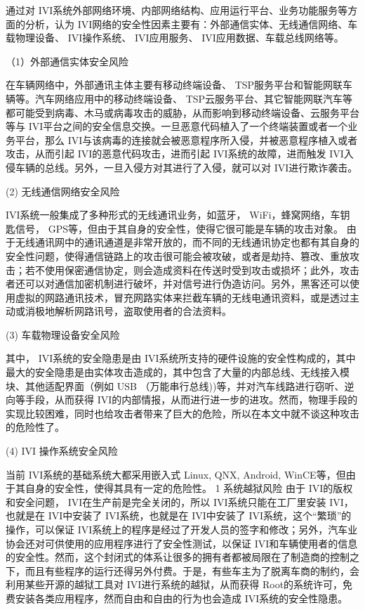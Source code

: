 通过对 IVI系统外部网络环境、内部网络结构、应用运行平台、业务功能服务等方面的分析，认为 IVI网络的安全性因素主要有：外部通信实体、无线通信网络、车载物理设备、 IVI操作系统、 IVI应用服务、 IVI应用数据、车载总线网络等。

（1）外部通信实体安全风险

在车辆网络中，外部通讯主体主要有移动终端设备、 TSP服务平台和智能网联车辆等。汽车网络应用中的移动终端设备、 TSP云服务平台、其它智能网联汽车等都可能受到病毒、木马或病毒攻击的威胁，从而影响到移动终端设备、云服务平台等与 IVI平台之间的安全信息交换。一旦恶意代码植入了一个终端装置或者一个业务平台，那么 IVI与该病毒的连接就会被恶意程序所入侵，并被恶意程序植入或者攻击，从而引起 IVI的恶意代码攻击，进而引起 IVI系统的故障，进而触发 IVI入侵车辆的总线。另外，一旦入侵方对其进行了入侵，就可以对 IVI进行欺诈袭击。

(2) 无线通信网络安全风险 

IVI系统一般集成了多种形式的无线通讯业务，如蓝牙， WiFi，蜂窝网络，车钥匙信号， GPS等，但由于其自身的安全性，使得它很可能是车辆的攻击对象。
由于无线通讯网中的通讯通道是非常开放的，而不同的无线通讯协定也都有其自身的安全性问题，使得通信链路上的攻击很可能会被攻破，或者是劫持、篡改、重放攻击；若不使用保密通信协定，则会造成资料在传送时受到攻击或损坏；此外，攻击者还可以对通信加密机制进行破坏，并对信号进行伪造访问。另外，黑客还可以使用虚拟的网路通讯技术，冒充网路实体来拦截车辆的无线电通讯资料，或是透过主动或消极地解析网路讯号，盗取使用者的合法资料。

(3) 车载物理设备安全风险 

其中， IVI系统的安全隐患是由 IVI系统所支持的硬件设施的安全性构成的，其中最大的安全隐患是由实体攻击造成的，其中包含了大量的内部总线、无线接入模块、其他适配界面（例如 USB （万能串行总线))等，并对汽车线路进行窃听、逆向等手段，从而获得 IVI的内部情报，从而进行进一步的进攻。然而，物理手段的实现比较困难，同时也给攻击者带来了巨大的危险，所以在本文中就不谈这种攻击的危险性了。

(4) IVI 操作系统安全风险 

当前 IVI系统的基础系统大都采用嵌入式 Linux, QNX, Android, WinCE等，但由于其自身的安全性，使得其具有一定的危险性。
1 系统越狱风险    
由于 IVI的版权和安全问题， IVI在生产前是完全关闭的，所以 IVI系统只能在工厂里安装 IVI，也就是在 IVI中安装了 IVI系统，也就是在 IVI中安装了 IVI系统，这个“繁琐”的操作，可以保证 IVI系统上的程序是经过了开发人员的签字和修改；另外，汽车业协会还对可供使用的应用程序进行了安全性测试，以保证 IVI和车辆使用者的信息的安全性。然而，这个封闭式的体系让很多的拥有者都被局限在了制造商的控制之下，而且有些程序的运行还得另外付费。于是，有些车主为了脱离车商的制约，会利用某些开源的越狱工具对 IVI进行系统的越狱，从而获得 Root的系统许可，免费安装各类应用程序，然而自由和自由的行为也会造成 IVI系统的安全性隐患。

